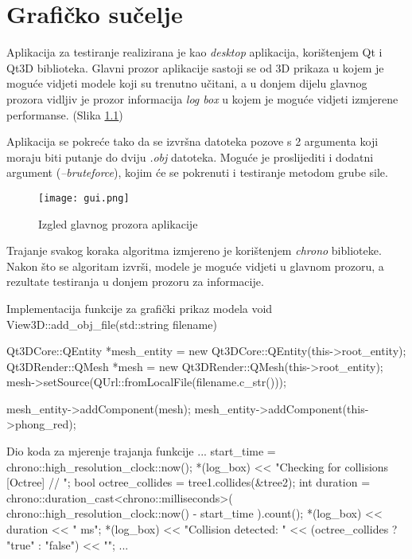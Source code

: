 \chapter{Grafičko sučelje}

Aplikacija za testiranje realizirana je kao \textit{desktop} aplikacija,
korištenjem Qt i Qt3D biblioteka. Glavni prozor aplikacije sastoji se od 
3D prikaza u kojem je moguće vidjeti modele koji su trenutno učitani, a
u donjem dijelu glavnog prozora vidljiv je prozor informacija \textit{log box}
u kojem je moguće vidjeti izmjerene performanse. (Slika \ref{gui})

Aplikacija se pokreće tako da se izvršna datoteka pozove s 2 argumenta koji moraju
biti putanje do dviju \textit{.obj} datoteka. Moguće je proslijediti i dodatni argument
(\textit{--bruteforce}), kojim će se pokrenuti i testiranje metodom grube sile.

\begin{figure}[h!]
    \centering
    \texttt{[image: gui.png]}
    \caption {Izgled glavnog prozora aplikacije}
    \label{gui}
\end{figure}

Trajanje svakog koraka algoritma izmjereno je korištenjem \textit{chrono} biblioteke.
Nakon što se algoritam izvrši, modele je moguće vidjeti u glavnom prozoru, a rezultate
testiranja u donjem prozoru za informacije.

\begin{cppSource}{Implementacija funkcije za grafički prikaz modela}
void View3D::add_obj_file(std::string filename) {
    Qt3DCore::QEntity *mesh_entity = new Qt3DCore::QEntity(this->root_entity);
    Qt3DRender::QMesh *mesh = new Qt3DRender::QMesh(this->root_entity);
    mesh->setSource(QUrl::fromLocalFile(filename.c_str()));

    mesh_entity->addComponent(mesh);
    mesh_entity->addComponent(this->phong_red);
}
\end{cppSource}

\begin{cppSource}{Dio koda za mjerenje trajanja funkcije}
...
start_time = chrono::high_resolution_clock::now();
*(log_box) << "Checking for collisions [Octree] // ";
bool octree_collides = tree1.collides(&tree2);
int duration = chrono::duration_cast<chrono::milliseconds>(
    chrono::high_resolution_clock::now() - start_time
).count();
*(log_box) << duration << " ms\n";
*(log_box) << "Collision detected: "
           << (octree_collides ? "true" : "false") << "\n";
...
\end{cppSource}
